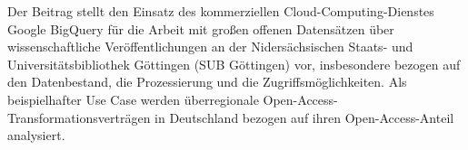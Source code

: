 Der Beitrag stellt den Einsatz des kommerziellen
Cloud-Computing-Dienstes Google BigQuery für die Arbeit mit großen
offenen Datensätzen über wissenschaftliche Veröffentlichungen an der
Nidersächsischen Staats- und Universitätsbibliothek Göttingen (SUB
Göttingen) vor, insbesondere bezogen auf den Datenbestand, die
Prozessierung und die Zugriffsmöglichkeiten. Als beispielhafter Use Case
werden überregionale Open-Access-Transformationsverträgen in Deutschland
bezogen auf ihren Open-Access-Anteil analysiert.
